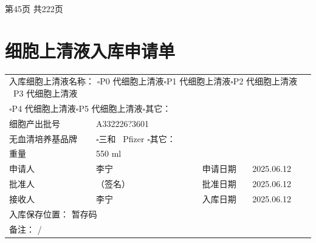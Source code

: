 \documentclass[UTF8,10pt,a4paper,fontset=fandol]{ctexart}
\newcommand{\fieldvalue}[1]{#1}
\newcommand{\handwritten}[1]{#1}
\begin{document}
\begin{center}
第45页 共222页
\end{center}

\newpage

\section*{细胞上清液入库申请单}

\noindent
\begin{tabularx}{\textwidth}{|p{3.2cm}|X|p{3.2cm}|X|}
\hline
\multicolumn{4}{|l|}{入库细胞上清液名称：\quad
$\square$P0 代细胞上清液\quad $\square$P1 代细胞上清液\quad $\square$P2 代细胞上清液\quad
\fieldvalue{\checkmark\ P3 代细胞上清液}}\\
\multicolumn{4}{|l|}{\hspace{3.2cm}
$\square$P4 代细胞上清液\quad $\square$P5 代细胞上清液\quad $\square$其它：\underline{\hspace{4cm}}}\\
\hline
细胞产出批号 &
\fieldvalue{\handwritten{A332226?3601}}\\
\hline
无血清培养基品牌 &
$\square$三和\quad
\fieldvalue{\checkmark\ Pfizer}
\quad $\square$其它：\underline{\hspace{5cm}}\\
\hline
重量 &
\fieldvalue{\handwritten{550 ml}}\\
\hline
申请人 &
\fieldvalue{\handwritten{李宁}}
&
申请日期 &
\fieldvalue{\handwritten{2025.06.12}}\\
\hline
批准人 &
\fieldvalue{\handwritten{（签名）}}
&
批准日期 &
\fieldvalue{\handwritten{2025.06.12}}\\
\hline
接收人 &
\fieldvalue{\handwritten{李宁}}
&
入库日期 &
\fieldvalue{\handwritten{2025.06.12}}\\
\hline
\multicolumn{4}{|l|}{入库保存位置：
\fieldvalue{\handwritten{暂存码}}}\\
\hline
\multicolumn{4}{|l|}{备注：
\fieldvalue{\handwritten{/}}}\\
\hline
\end{tabularx}
\end{document}
